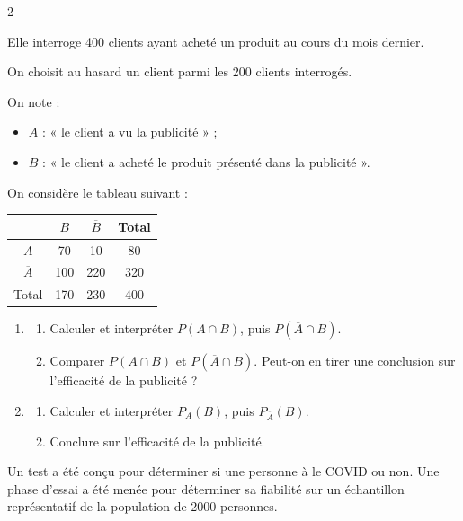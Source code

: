 \documentclass[10pt,a4paper]{article}
\begin{document}
\begin{multicols}{2}
\begin{exo}[][]
Elle interroge 400 clients ayant acheté un produit au cours du mois dernier.


On choisit au hasard un client parmi les 200 clients interrogés.

On note :
\begin{itemize}
    \item $A$ : « le client a vu la publicité » ;
    \item $B$ : « le client a acheté le produit présenté dans la publicité ».
\end{itemize}

On considère le tableau suivant :
\begin{center}
    \renewcommand{\arraystretch}{1.3}
    \begin{tabular}{|c|c|c|c|}
        \hline
        & $B$ & $\overline{B}$ & Total \\
        \hline
        $A$ & 70 & 10 & 80 \\
        \hline
        $\overline{A}$ & 100 & 220 & 320 \\
        \hline
        Total & 170 & 230 & 400 \\
        \hline
    \end{tabular}
    \end{center}

\begin{enumerate}
    \item \begin{enumerate}
        \item Calculer et interpréter $P(A\cap B)$, puis $P(\overline{A}\cap B)$.
        \item Comparer $P(A\cap B)$ et $P(\overline{A}\cap B)$. Peut-on en tirer une conclusion sur l'efficacité de la publicité ?
    \end{enumerate}

    \item \begin{enumerate}
        \item Calculer et interpréter $P_A(B)$, puis $P_{\overline{A}}( B)$.
        \item Conclure sur l'efficacité de la publicité.
    \end{enumerate}
\end{enumerate}
\end{exo}

\begin{exo}[][bac]
    
Un test a été conçu pour déterminer si une personne à le COVID ou non. Une phase d'essai a été menée pour déterminer sa fiabilité sur un échantillon représentatif de la population de 2000 personnes.


\end{exo}
\end{multicols}
\end{document}
